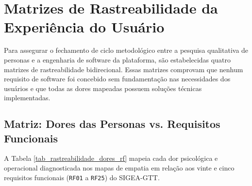 \chapter{Matrizes de Rastreabilidade da Experiência do Usuário}
\label{cap_matrizes_rastreabilidade_ux}

Para assegurar o fechamento de ciclo metodológico entre a pesquisa qualitativa de personas e a engenharia de software da plataforma, são estabelecidas quatro matrizes de rastreabilidade bidirecional. Essas matrizes comprovam que nenhum requisito de software foi concebido sem fundamentação nas necessidades dos usuários e que todas as dores mapeadas possuem soluções técnicas implementadas.

\section{Matriz: Dores das Personas vs. Requisitos Funcionais}
\label{sec_matriz_dores_rf}

A Tabela \ref{tab_rastreabilidade_dores_rf} mapeia cada dor psicológica e operacional diagnosticada nos mapas de empatia em relação aos vinte e cinco requisitos funcionais (\texttt{RF01} a \texttt{RF25}) do SIGEA-GTT.

